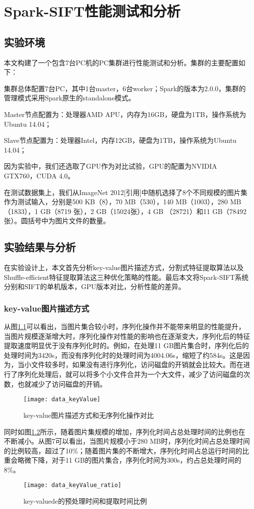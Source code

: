 ﻿\chapter{Spark-SIFT性能测试和分析}
\section{实验环境}
本文构建了一个包含7台PC机的PC集群进行性能测试和分析。集群的主要配置如下：
\begin{compactenum}
\item 集群总体配置7台PC，其中1台master，6台worker；Spark的版本为2.0.0，集群的管理模式采用Spark原生的standalone模式。
\item Master节点配置为：处理器AMD APU，内存为16GB，硬盘为1TB，操作系统为Ubuntu 14.04；
\item Slave节点配置为：处理器Intel，内存12GB，硬盘为1TB，操作系统为Ubuntu 14.04；
\end{compactenum}

因为实验中，我们还选取了GPU作为对比试验，GPU的配置为NVIDIA GTX760，CUDA 4.0。

在测试数据集上，我们从ImageNet 2012[引用]中随机选择了8个不同规模的图片集作为测试输入，分别是500 KB（8），70 MB（530），140 MB（1003），280 MB（1833），1 GB（8719 张），2 GB（15024张），4 GB （28721）和11 GB（78492张）。圆括号中为图片文件的数量。
\section{实验结果与分析}
在实验设计上，本文首先分析key-value图片描述方式，分割式特征提取算法以及Shuffle-efficient特征提取算法这三种优化策略的性能。最后本文将Spark-SIFT系统分别和SIFT的单机版本，GPU版本对比，分析性能的差异。
\subsection{key-value图片描述方式}
从图\ref{fig:data_keyValue}可以看出，当图片集合较小时，序列化操作并不能带来明显的性能提升，当图片规模逐渐增大时，序列化操作对性能的影响也在逐渐变大，序列化后的特征提取速度明显优于没有序列化时的。例如，在处理11 GB图片集合时，序列化后的处理时间为3420s，而没有序列化时的处理时间为4004.06s，缩短了约584s。这是因为，当小文件较多时，如果没有进行序列化，访问磁盘的开销就会比较大。而在进行了序列化处理后，就可以将多个小文件合并为一个大文件，减少了访问磁盘的次数，也就减少了访问磁盘的开销。
\begin{figure}[htp]
\centering
\texttt{[image: data\_keyValue]}
\caption{key-value图片描述方式和无序列化操作对比}
\label{fig:data_keyValue}
\end{figure}
同时如图\ref{fig:data_keyValue_ratio}所示，随着图片集规模的增加，序列化时间占总处理时间的比例也在不断减小。从图7可以看出，当图片规模小于280 MB时，序列化时间占总处理时间的比例较高，超过了10\%；随着图片集的不断增大，序列化时间占总运行时间的比重会略微下降，对于11 GB的图片集合，序列化时间为300s，约占总处理时间的8\%。
\begin{figure}[htp]
\centering
\texttt{[image: data\_keyValue\_ratio]}
\caption{key-valuede的预处理时间和提取时间比例}
\label{fig:data_keyValue_ratio}
\end{figure}

